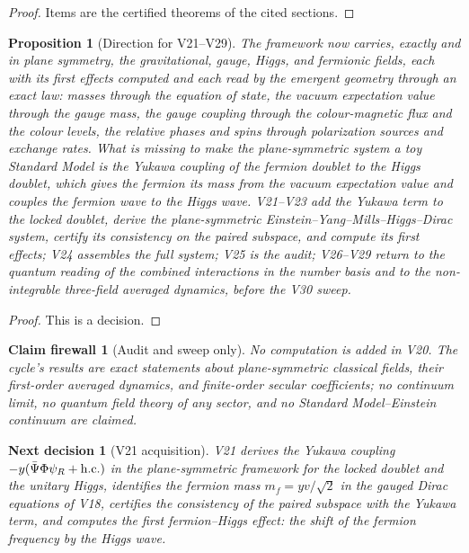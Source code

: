 \documentclass[11pt]{article}
\newtheorem{proposition}[theorem]{Proposition}
\newtheorem{firewall}[theorem]{Claim firewall}
\newtheorem{decision}[theorem]{Next decision}
\theoremstyle{remark}
\begin{document}
\begin{proof}
Items are the certified theorems of the cited sections.
\end{proof}

\begin{proposition}[Direction for V21--V29]
\label{prop:v20v20-direction}
The framework now carries, exactly and in plane symmetry, the
gravitational, gauge, Higgs, and fermionic fields, each with its
first effects computed and each read by the emergent geometry
through an exact law: masses through the equation of state, the vacuum
expectation value through the gauge mass, the gauge coupling through
the colour-magnetic flux and the colour levels, the relative phases
and spins through polarization sources and exchange rates.  What is
missing to make the plane-symmetric system a toy Standard Model is
the Yukawa coupling of the fermion doublet to the Higgs doublet, which
gives the fermion its mass from the vacuum expectation value and
couples the fermion wave to the Higgs wave.  V21--V23 add the Yukawa
term to the locked doublet, derive the plane-symmetric
Einstein--Yang--Mills--Higgs--Dirac system, certify its consistency on
the paired subspace, and compute its first effects; V24 assembles the
full system; V25 is the audit; V26--V29 return to the quantum reading
of the combined interactions in the number basis and to the
non-integrable three-field averaged dynamics, before the V30 sweep.
\end{proposition}

\begin{proof}
This is a decision.
\end{proof}

\begin{firewall}[Audit and sweep only]
\label{fire:v20v20}
No computation is added in V20.  The cycle's results are exact
statements about plane-symmetric classical fields, their first-order
averaged dynamics, and finite-order secular coefficients; no
continuum limit, no quantum field theory of any sector, and no
Standard Model--Einstein continuum are claimed.
\end{firewall}

\begin{decision}[V21 acquisition]
\label{dec:v20v20-next}
V21 derives the Yukawa coupling \(-y(\bar\Psi\Phi\psi_R+\hbox{h.c.})\)
in the plane-symmetric framework for the locked doublet and the
unitary Higgs, identifies the fermion mass \(m_f=yv/\sqrt2\) in the
gauged Dirac equations of V18, certifies the consistency of the
paired subspace with the Yukawa term, and computes the first
fermion--Higgs effect: the shift of the fermion frequency by the Higgs
wave.
\end{decision}
\end{document}
